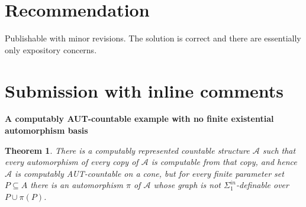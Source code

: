 \documentclass[12pt]{article}
\newtheorem{theorem}{Theorem}
\begin{document}
\section{Recommendation}

Publishable with minor revisions. The solution is correct and there are essentially only expository concerns.

  \section{Submission with inline comments}


\date{}


\begin{center}
{\bf A computably AUT-countable example with no finite existential
automorphism basis}
\end{center}

\begin{theorem}
There is a computably represented countable structure $\mathcal A$ such
that every automorphism of every copy of $\mathcal A$ is computable from
that copy, and hence $\mathcal A$ is computably AUT-countable on a cone,
but for every finite parameter set $P\subseteq A$ there is an
automorphism $\pi$ of $\mathcal A$ whose graph is not
$\Sigma^{in}_1$-definable over $P\cup\pi(P)$.
\end{theorem}
\end{document}
